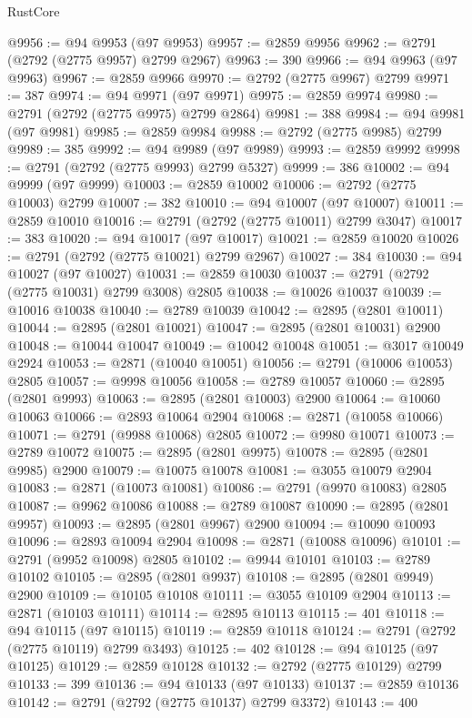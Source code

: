 \begin{lexlean}{RustCore}
\begin{coremodule}
@9956 := @94 @9953 (@97 @9953)
@9957 := @2859 @9956
@9962 := @2791 (@2792 (@2775 @9957) @2799 @2967)
@9963 := 390
@9966 := @94 @9963 (@97 @9963)
@9967 := @2859 @9966
@9970 := @2792 (@2775 @9967) @2799
@9971 := 387
@9974 := @94 @9971 (@97 @9971)
@9975 := @2859 @9974
@9980 := @2791 (@2792 (@2775 @9975) @2799 @2864)
@9981 := 388
@9984 := @94 @9981 (@97 @9981)
@9985 := @2859 @9984
@9988 := @2792 (@2775 @9985) @2799
@9989 := 385
@9992 := @94 @9989 (@97 @9989)
@9993 := @2859 @9992
@9998 := @2791 (@2792 (@2775 @9993) @2799 @5327)
@9999 := 386
@10002 := @94 @9999 (@97 @9999)
@10003 := @2859 @10002
@10006 := @2792 (@2775 @10003) @2799
@10007 := 382
@10010 := @94 @10007 (@97 @10007)
@10011 := @2859 @10010
@10016 := @2791 (@2792 (@2775 @10011) @2799 @3047)
@10017 := 383
@10020 := @94 @10017 (@97 @10017)
@10021 := @2859 @10020
@10026 := @2791 (@2792 (@2775 @10021) @2799 @2967)
@10027 := 384
@10030 := @94 @10027 (@97 @10027)
@10031 := @2859 @10030
@10037 := @2791 (@2792 (@2775 @10031) @2799 @3008) @2805
@10038 := @10026 @10037
@10039 := @10016 @10038
@10040 := @2789 @10039
@10042 := @2895 (@2801 @10011)
@10044 := @2895 (@2801 @10021)
@10047 := @2895 (@2801 @10031) @2900
@10048 := @10044 @10047
@10049 := @10042 @10048
@10051 := @3017 @10049 @2924
@10053 := @2871 (@10040 @10051)
@10056 := @2791 (@10006 @10053) @2805
@10057 := @9998 @10056
@10058 := @2789 @10057
@10060 := @2895 (@2801 @9993)
@10063 := @2895 (@2801 @10003) @2900
@10064 := @10060 @10063
@10066 := @2893 @10064 @2904
@10068 := @2871 (@10058 @10066)
@10071 := @2791 (@9988 @10068) @2805
@10072 := @9980 @10071
@10073 := @2789 @10072
@10075 := @2895 (@2801 @9975)
@10078 := @2895 (@2801 @9985) @2900
@10079 := @10075 @10078
@10081 := @3055 @10079 @2904
@10083 := @2871 (@10073 @10081)
@10086 := @2791 (@9970 @10083) @2805
@10087 := @9962 @10086
@10088 := @2789 @10087
@10090 := @2895 (@2801 @9957)
@10093 := @2895 (@2801 @9967) @2900
@10094 := @10090 @10093
@10096 := @2893 @10094 @2904
@10098 := @2871 (@10088 @10096)
@10101 := @2791 (@9952 @10098) @2805
@10102 := @9944 @10101
@10103 := @2789 @10102
@10105 := @2895 (@2801 @9937)
@10108 := @2895 (@2801 @9949) @2900
@10109 := @10105 @10108
@10111 := @3055 @10109 @2904
@10113 := @2871 (@10103 @10111)
@10114 := @2895 @10113
@10115 := 401
@10118 := @94 @10115 (@97 @10115)
@10119 := @2859 @10118
@10124 := @2791 (@2792 (@2775 @10119) @2799 @3493)
@10125 := 402
@10128 := @94 @10125 (@97 @10125)
@10129 := @2859 @10128
@10132 := @2792 (@2775 @10129) @2799
@10133 := 399
@10136 := @94 @10133 (@97 @10133)
@10137 := @2859 @10136
@10142 := @2791 (@2792 (@2775 @10137) @2799 @3372)
@10143 := 400

\end{coremodule}
\end{lexlean}
